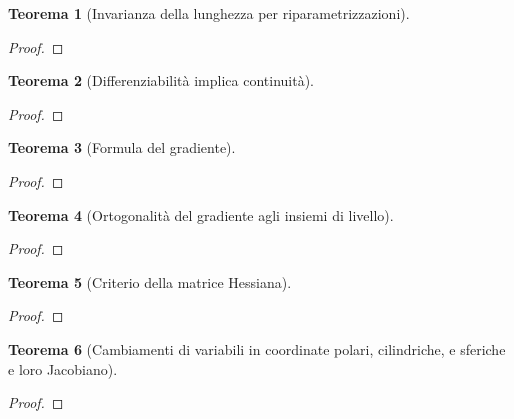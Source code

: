 \documentclass[12pt, a4paper]{article}
\theoremstyle{break}
\newtheorem{theorem}{Teorema}[section]
\begin{document}
\newpage
\begin{theorem} [Invarianza della lunghezza per riparametrizzazioni]
\end{theorem}
\begin{proof}
\end{proof}

\newpage
\begin{theorem} [Differenziabilità implica continuità]
\end{theorem}
\begin{proof}
\end{proof}

\newpage
\begin{theorem} [Formula del gradiente]
\end{theorem}
\begin{proof}
\end{proof}

\newpage
\begin{theorem} [Ortogonalità del gradiente agli insiemi di livello]
\end{theorem}
\begin{proof}
\end{proof}

\newpage
\begin{theorem} [Criterio della matrice Hessiana]
\end{theorem}
\begin{proof}
\end{proof}

\newpage
\begin{theorem} [Cambiamenti di variabili in coordinate polari, cilindriche, e
	sferiche e loro Jacobiano]
\end{theorem}
\begin{proof}
\end{proof}
\end{document}
